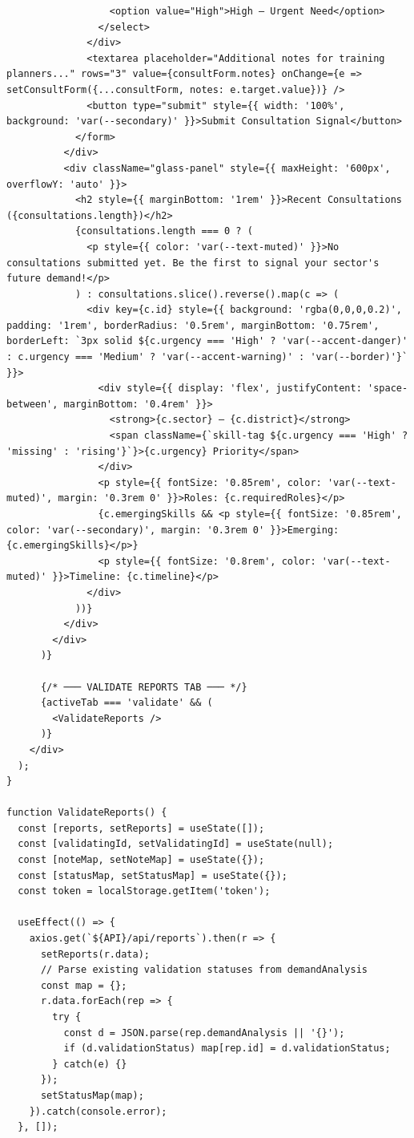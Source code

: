 \documentclass[12pt,a4paper]{report}
\begin{document}
\begin{verbatim}
                  <option value="High">High — Urgent Need</option>
                </select>
              </div>
              <textarea placeholder="Additional notes for training planners..." rows="3" value={consultForm.notes} onChange={e => setConsultForm({...consultForm, notes: e.target.value})} />
              <button type="submit" style={{ width: '100%', background: 'var(--secondary)' }}>Submit Consultation Signal</button>
            </form>
          </div>
          <div className="glass-panel" style={{ maxHeight: '600px', overflowY: 'auto' }}>
            <h2 style={{ marginBottom: '1rem' }}>Recent Consultations ({consultations.length})</h2>
            {consultations.length === 0 ? (
              <p style={{ color: 'var(--text-muted)' }}>No consultations submitted yet. Be the first to signal your sector's future demand!</p>
            ) : consultations.slice().reverse().map(c => (
              <div key={c.id} style={{ background: 'rgba(0,0,0,0.2)', padding: '1rem', borderRadius: '0.5rem', marginBottom: '0.75rem', borderLeft: `3px solid ${c.urgency === 'High' ? 'var(--accent-danger)' : c.urgency === 'Medium' ? 'var(--accent-warning)' : 'var(--border)'}` }}>
                <div style={{ display: 'flex', justifyContent: 'space-between', marginBottom: '0.4rem' }}>
                  <strong>{c.sector} — {c.district}</strong>
                  <span className={`skill-tag ${c.urgency === 'High' ? 'missing' : 'rising'}`}>{c.urgency} Priority</span>
                </div>
                <p style={{ fontSize: '0.85rem', color: 'var(--text-muted)', margin: '0.3rem 0' }}>Roles: {c.requiredRoles}</p>
                {c.emergingSkills && <p style={{ fontSize: '0.85rem', color: 'var(--secondary)', margin: '0.3rem 0' }}>Emerging: {c.emergingSkills}</p>}
                <p style={{ fontSize: '0.8rem', color: 'var(--text-muted)' }}>Timeline: {c.timeline}</p>
              </div>
            ))}
          </div>
        </div>
      )}

      {/* ─── VALIDATE REPORTS TAB ─── */}
      {activeTab === 'validate' && (
        <ValidateReports />
      )}
    </div>
  );
}

function ValidateReports() {
  const [reports, setReports] = useState([]);
  const [validatingId, setValidatingId] = useState(null);
  const [noteMap, setNoteMap] = useState({});
  const [statusMap, setStatusMap] = useState({});
  const token = localStorage.getItem('token');

  useEffect(() => {
    axios.get(`${API}/api/reports`).then(r => {
      setReports(r.data);
      // Parse existing validation statuses from demandAnalysis
      const map = {};
      r.data.forEach(rep => {
        try {
          const d = JSON.parse(rep.demandAnalysis || '{}');
          if (d.validationStatus) map[rep.id] = d.validationStatus;
        } catch(e) {}
      });
      setStatusMap(map);
    }).catch(console.error);
  }, []);


\end{verbatim}
\end{document}
